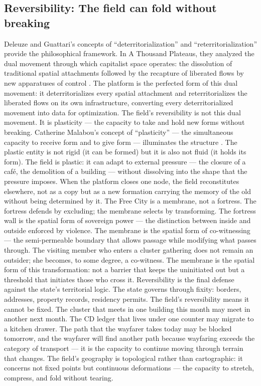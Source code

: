 \subsection{Reversibility: The field can fold without breaking}

Deleuze and Guattari’s concepts of “deterritorialization” and “reterritorialization” provide the philosophical framework. In A Thousand Plateaus, they analyzed the dual movement through which capitalist space operates: the dissolution of traditional spatial attachments followed by the recapture of liberated flows by new apparatuses of control \cite[pp.~310--320]{deleuze_guattari_1987}. The platform is the perfected form of this dual movement: it deterritorializes every spatial attachment and reterritorializes the liberated flows on its own infrastructure, converting every deterritorialized movement into data for optimization. The field’s reversibility is not this dual movement. It is plasticity — the capacity to take and hold new forms without breaking. Catherine Malabou’s concept of “plasticity” — the simultaneous capacity to receive form and to give form — illuminates the structure \cite{malabou_2008}. The plastic entity is not rigid (it can be formed) but it is also not fluid (it holds its form). The field is plastic: it can adapt to external pressure — the closure of a café, the demolition of a building — without dissolving into the shape that the pressure imposes. When the platform closes one node, the field reconstitutes elsewhere, not as a copy but as a new formation carrying the memory of the old without being determined by it. The Free City is a membrane, not a fortress. The fortress defends by excluding; the membrane selects by transforming. The fortress wall is the spatial form of sovereign power — the distinction between inside and outside enforced by violence. The membrane is the spatial form of co-witnessing — the semi-permeable boundary that allows passage while modifying what passes through. The visiting member who enters a cluster gathering does not remain an outsider; she becomes, to some degree, a co-witness. The membrane is the spatial form of this transformation: not a barrier that keeps the uninitiated out but a threshold that initiates those who cross it. Reversibility is the final defense against the state’s territorial logic. The state governs through fixity: borders, addresses, property records, residency permits. The field’s reversibility means it cannot be fixed. The cluster that meets in one building this month may meet in another next month. The CD ledger that lives under one counter may migrate to a kitchen drawer. The path that the wayfarer takes today may be blocked tomorrow, and the wayfarer will find another path because wayfaring exceeds the category of transport — it is the capacity to continue moving through terrain that changes. The field’s geography is topological rather than cartographic: it concerns not fixed points but continuous deformations — the capacity to stretch, compress, and fold without tearing.


